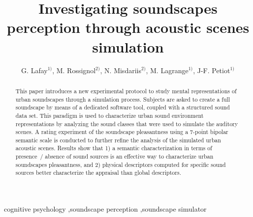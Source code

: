 \documentclass[12pt]{elsarticle}
\begin{document}
\begin{frontmatter}


    \author{G. Lafay$^{1)}$, M. Rossignol$^{2)}$, N. Misdariis$^{2)}$, M. Lagrange$^{1)}$, J-F. Petiot$^{1)}$}

    \address{$^{1)}$ Laboratoire des Sciences du Numérique de Nantes-CNRS-\'Ecole Centrale de Nantes, Nantes, France.\\
    \hspace*{8pt}mathieu.lagrange@cnrs.fr\\
    $^{2)}$ STMS Ircam-CNRS-UPMC Institut de Recherche et Coordination Acoustique/Musique, Paris, France}


    \title{Investigating soundscapes perception through acoustic scenes simulation}

  \begin{abstract}
    This paper introduces a new experimental protocol to study mental representations of urban soundscapes through a simulation process. Subjects are asked to create a full soundscape by means of a dedicated software tool, coupled with a structured sound data set. This paradigm is used to characterize urban sound environment representations by analyzing the sound classes that were used to simulate the auditory scenes. A rating experiment of the soundscape pleasantness using a 7-point bipolar semantic scale is conducted to further refine the analysis of the simulated urban acoustic scenes. Results show that 1) a semantic characterization in terms of presence~/ absence of sound sources is an effective way to characterize urban soundscapes pleasantness, and 2) physical descriptors computed for specific sound sources better characterize the appraisal than global descriptors.
  \end{abstract}

  \begin{keyword}
 cognitive psychology \sep soundscape perception \sep soundscape simulator


  \end{keyword}

\end{frontmatter}


\end{document}
